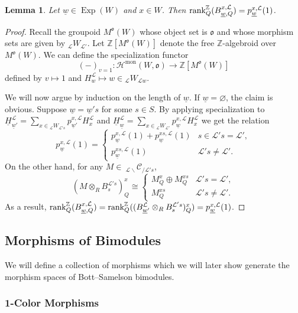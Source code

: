 \documentclass{amsart}
\newcommand{\Z}{\mathbb{Z}}
\newcommand{\scrH}{\mathcal{H}}
\newcommand{\scrL}{\mathcal{L}}
\newcommand{\fr}[1]{\mathfrak{#1}}
\DeclareMathOperator{\mon}{mon}
\newcommand{\Cmon}[2]{\:_{#1 \backslash} \mathcal{C}_{/ #2} }
\DeclareMathOperator{\Exp}{Exp}
\newcommand{\W}[2]{{}_{#1}W_{#2}}
\newcommand{\uw}{\underline{w}}
\newcommand{\grk}{\textnormal{rank}^{\Z}}
\renewcommand{\emptyset}{\varnothing}
\newtheorem{lemma}[subsubsection]{Lemma}
\theoremstyle{definition}
\numberwithin{equation}{subsection}
\begin{document}
\begin{lemma}\label{lem:dim_of_Bwx_over_Q}
    Let $\uw \in \Exp (W)$ and $x \in W$. Then $\grk_Q (B_{\uw, Q}^{x, \scrL}) = p_{\uw}^{x, \scrL} (1)$.
\end{lemma}
\begin{proof}
    Recall the groupoid $M^{\fr{o}} (W)$ whose object set is $\fr{o}$ and whose morphism sets are given by $\W{\scrL}{\scrL'}$.
    Let $\Z [M^{\fr{o}} (W)]$ denote the free $\Z$-algebroid over $M^{\fr{o}} (W)$.
    We can define the specialization functor
    \[(-)_{v=1} : \scrH^{\mon} (W, \fr{o}) \to \Z [M^{\fr{o}} (W)]\]
    defined by $v \mapsto 1$ and $H_w^{\scrL} \mapsto w \in \W{\scrL}{\scrL w}$.

    We will now argue by induction on the length of $\uw$.
    If $\uw = \emptyset$, the claim is obvious.
    Suppose $\uw = \uw' s$ for some $s \in S$.
    By applying specialization to $\underline{H}_{\uw'}^{\scrL} = \sum_{x \in \W{\scrL}{\scrL' s}} p_{\uw'}^{x, \scrL} H_x^{\scrL}$ and $\underline{H}_{\uw}^{\scrL} = \sum_{x \in \W{\scrL}{\scrL'}} p_{\uw}^{x, \scrL} H_x^{\scrL}$ we get the relation
    \[p_{\uw}^{x, \scrL} (1) = \begin{cases} p_{\uw}^{x, \scrL} (1) + p_{\uw}^{xs, \scrL} (1) & s \in \scrL' s = \scrL', \\ p_{\uw}^{xs, \scrL} (1) & \scrL' s \neq \scrL'. \end{cases}\]
    On the other hand, for any $M \in \Cmon{\scrL}{\scrL' s}$,
    \[ (M \otimes_R B_s^{\scrL' s})_Q^x \cong \begin{cases} M_Q^x \oplus M_Q^{xs} & \scrL' s = \scrL', \\ M_Q^{xs} & \scrL' s \neq \scrL'. \end{cases}  \]
    As a result, $\grk_Q (B_{\uw, Q}^{x, \scrL}) = \grk_Q ((B_{\uw'}^{\scrL} \otimes_R B_{s}^{\scrL' s})_Q^x ) = p_{\uw}^{x, \scrL} (1)$.
\end{proof}

\subsection{Morphisms of Bimodules}\label{subsec:abe_mors}

We will define a collection of morphisms which we will later show generate the morphism spaces of Bott--Samelson bimodules.

\subsubsection{1-Color Morphisms}
\end{document}
